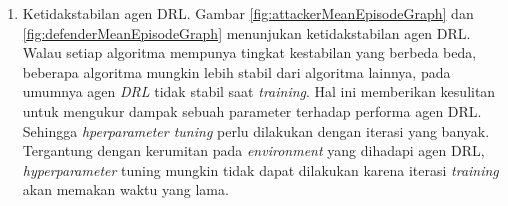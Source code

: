 \begin{enumerate}[nolistsep]
  \item Ketidakstabilan agen DRL.
  Gambar \ref{fig:attackerMeanEpisodeGraph} dan \ref{fig:defenderMeanEpisodeGraph} menunjukan ketidakstabilan agen DRL.
  Walau setiap algoritma mempunya tingkat kestabilan yang berbeda beda, beberapa algoritma mungkin lebih stabil dari algoritma lainnya,
  pada umumnya agen \emph{DRL} tidak stabil saat \emph{training}.
  Hal ini memberikan kesulitan untuk mengukur dampak sebuah parameter terhadap performa agen DRL.
  Sehingga \emph{hperparameter tuning} perlu dilakukan dengan iterasi yang banyak.
  Tergantung dengan kerumitan pada \emph{environment} yang dihadapi agen DRL,
  \emph{hyperparameter} tuning mungkin tidak dapat dilakukan karena iterasi \emph{training} akan memakan waktu yang lama.
\end{enumerate}